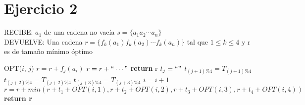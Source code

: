 \documentclass{article}
\begin{document}

    
\section*{Ejercicio 2}

\vspace{0.5cm}

\noindent RECIBE: $a_{1}$ de una cadena no vacía $s=\{a_1a_2\cdots a_n\}$ \\
DEVUELVE: Una cadena $r=\{f_k(a_1)f_k(a_2)\cdots f_k(a_n)\}$ tal que $1 \leq k \leq 4$ y r es
de tamaño mínimo óptimo
\begin{algorithmic}[1]
\item[]{OPT($i$, $j$)}
\State $r=r+f_j(a_i)$
\Else 
\State $r=r+``\cdots"$
\EndIf
{}
\State \textbf{return} r
\EndIf
\State $t_j = ``"$
\State $t_{(j+1)\%4} = T_{(j+1)\%4}$
\State $t_{(j+2)\%4} = T_{(j+2)\%4}$
\State $t_{(j+3)\%4} = T_{(j+3)\%4}$
\State $i = i+1$
\State $r=r+min(r+t_1+OPT(i,1),r+t_2+OPT(i,2),
r+t_3+OPT(i,3), r+t_4+OPT(i,4))$
\State \textbf{return r} 
\end{algorithmic}
\end{document}
